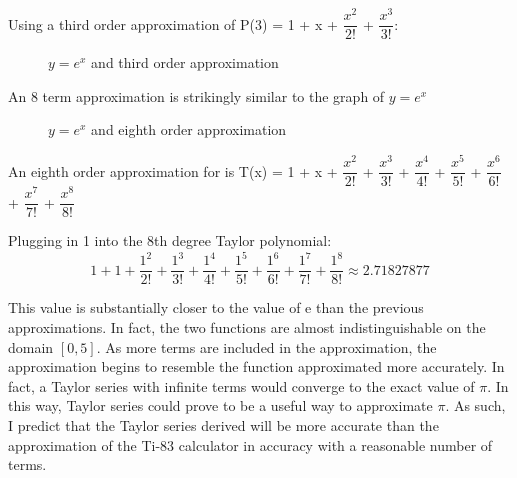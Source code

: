 \documentclass[12pt, titlepage]{article}
\begin{document}
Using a third order approximation of P(3) = 1 + x + \(\dfrac{x^{2}}{2!}\) + \(\dfrac{x^{3}}{3!}\):
\begin{figure}[H]
\centering
    \caption[]{\(y=e^x\) and third order approximation}
\end{figure}

An 8 term approximation is strikingly similar to the graph of \(y = e^{x}\)
\begin{figure}[H]
\centering
    \caption[]{\(y=e^x\) and eighth order approximation}
\end{figure}

An eighth order approximation for is T(x) = 1 + x + \(\dfrac{x^2}{2!}\) + \(\dfrac{x^3}{3!}\)
+ \(\dfrac{x^4}{4!}\) + \(\dfrac{x^5}{5!}\) + \(\dfrac{x^6}{6!}\) + \(\dfrac{x^7}{7!}\) + \(\dfrac{x^8}{8!}\)

Plugging in 1 into the 8th degree Taylor polynomial:
\begin{equation*}
  1 + 1 + \dfrac{1^2}{2!} + \dfrac{1^3}{3!} + \dfrac{1^4}{4!} + \dfrac{1^5}{5!} + \dfrac{1^6}{6!} + \dfrac{1^7}{7!} + \dfrac{1^8}{8!} \approx 2.71827877
\end{equation*}

This value is substantially closer to the value of e than the previous approximations. In fact, the two functions are almost indistinguishable on the domain \([0,5]\). As more terms are included in the approximation, the approximation begins to resemble the function approximated more accurately. In fact, a Taylor series with infinite terms would converge to the exact value of \(\pi\). In this way, Taylor series could prove to be a useful way to approximate \(\pi\). As such, I predict that the Taylor series derived will be more accurate than the approximation of the Ti-83 calculator in accuracy with a reasonable number of terms.
\end{document}
